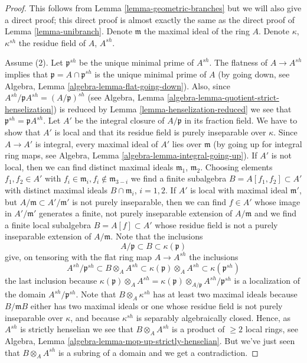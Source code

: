 \documentclass[10pt,a4paper]{amsart}
\theoremstyle{plain}
\theoremstyle{definition}
\theoremstyle{remark}
\numberwithin{equation}{subsection}
\begin{document}
\begin{proof}
This follows from Lemma \ref{lemma-geometric-branches}
but we will also give a direct proof; this direct
proof is almost exactly the same as the direct proof of
Lemma \ref{lemma-unibranch}.
Denote $\mathfrak m$ the maximal ideal of the ring $A$.
Denote $\kappa$, $\kappa^{sh}$ the residue field of $A$, $A^{sh}$.

\medskip\noindent
Assume (2). Let $\mathfrak p^{sh}$ be the unique minimal prime of
$A^{sh}$. The flatness of $A \to A^{sh}$ implies that
$\mathfrak p = A \cap \mathfrak p^{sh}$ is the unique minimal
prime of $A$ (by going down, see
Algebra, Lemma \ref{algebra-lemma-flat-going-down}).
Also, since $A^{sh}/\mathfrak pA^{sh} = (A/\mathfrak p)^{sh}$ (see
Algebra, Lemma \ref{algebra-lemma-quotient-strict-henselization})
is reduced by Lemma \ref{lemma-henselization-reduced}
we see that $\mathfrak p^{sh} = \mathfrak pA^{sh}$.
Let $A'$ be the integral closure of $A/\mathfrak p$ in its fraction
field. We have to show that $A'$ is local and that its residue
field is purely inseparable over $\kappa$.
Since $A \to A'$ is integral, every maximal ideal of $A'$ lies over
$\mathfrak m$ (by going up for integral ring maps, see
Algebra, Lemma \ref{algebra-lemma-integral-going-up}).
If $A'$ is not local, then we can find distinct maximal ideals
$\mathfrak m_1$, $\mathfrak m_2$. Choosing elements $f_1, f_2 \in A'$
with $f_i \in \mathfrak m_i, f_i \not \in \mathfrak m_{3 - i}$ we find
a finite subalgebra $B = A[f_1, f_2] \subset A'$ with distinct maximal
ideals $B \cap \mathfrak m_i$, $i = 1, 2$. If $A'$ is local with maximal
ideal $\mathfrak m'$, but $A/\mathfrak m \subset A'/\mathfrak m'$
is not purely inseparable, then we can find $f \in A'$ whose image in
$A'/\mathfrak m'$ generates a finite, not purely inseparable extension
of $A/\mathfrak m$ and we find a finite local subalgebra $B = A[f] \subset A'$
whose residue field is not a purely inseparable extension of $A/\mathfrak m$.
Note that the inclusions
$$
A/\mathfrak p \subset B \subset \kappa(\mathfrak p)
$$
give, on tensoring with the flat ring map $A \to A^{sh}$ the inclusions
$$
A^{sh}/\mathfrak p^{sh} \subset
B \otimes_A A^{sh} \subset
\kappa(\mathfrak p) \otimes_A A^{sh} \subset
\kappa(\mathfrak p^{sh})
$$
the last inclusion because
$\kappa(\mathfrak p) \otimes_A A^{sh} =
\kappa(\mathfrak p) \otimes_{A/\mathfrak p} A^{sh}/\mathfrak p^{sh}$
is a localization of the domain $A^{sh}/\mathfrak p^{sh}$.
Note that $B \otimes_A \kappa^{sh}$ has at least two maximal ideals
because $B/\mathfrak mB$ either has two maximal ideals or one whose
residue field is not purely inseparable over $\kappa$, and because
$\kappa^{sh}$ is separably algebraically closed. Hence, as
$A^{sh}$ is strictly henselian we see that
$B \otimes_A A^{sh}$ is a product of $\geq 2$ local rings, see
Algebra, Lemma \ref{algebra-lemma-mop-up-strictly-henselian}.
But we've just seen that $B \otimes_A A^{sh}$ is a subring of a domain
and we get a contradiction.


\end{proof}
\end{document}
